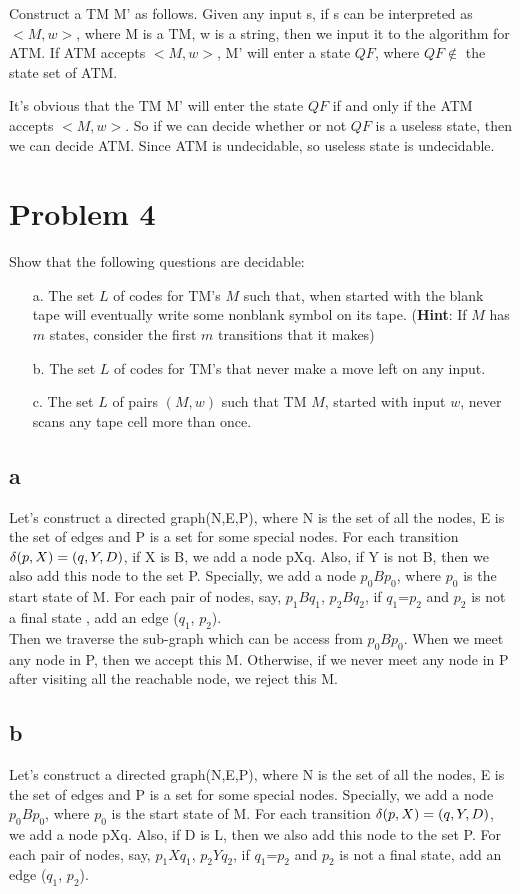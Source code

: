 \documentclass[a4paper,UTF8]{ctexart}
\theoremstyle{definition}
\begin{document}
Construct a TM M' as follows.
Given any input s, if s can be interpreted as $<M,w>$, where M is a TM, w is a string,
then we input it to the algorithm for ATM. If ATM accepts $<M,w>$, M' will enter a state $QF$, where
$QF \notin$ the state set of ATM.

 It's obvious that the TM M' will enter the state $QF$ if and only if the 
ATM accepts $<M,w>$. So if we can decide whether or not $QF$ is a useless state, then we can decide ATM. Since
ATM is undecidable, so useless state is undecidable.


\section*{Problem 4}
Show that the following questions are decidable:
\begin{enumerate}
  \item[a.] The set $L$ of codes for TM’s $M$ such that, when started with the blank tape will eventually write some nonblank symbol on its tape. (\textbf{Hint}: If $M$ has $m$ states, consider the first $m$ transitions that it makes)
  \item[b.] The set $L$ of codes for TM’s that never make a move left on any input.
  \item[c.] The set $L$ of pairs $(M,w)$ such that TM $M$, started with input $w$, never scans any tape cell more than once.
\end{enumerate}

\subsection*{a}
Let's construct a directed graph(N,E,P), where N is the set of all the nodes, 
E is the set of edges and P is a set for some special nodes. For each transition
$\delta(p,X)=(q,Y,D)$, if X is B, we add a node pXq. Also, if Y is not B, then 
we also add this node to the set P. Specially, we add a node $p_0Bp_0$, where $p_0$ is 
the start state of M. 
For each pair of nodes, say, $p_1Bq_1$, $p_2Bq_2$, 
if $q_1$=$p_2$ and $p_2$ is not a final state , add an edge ($q_1$, $p_2$). \\

Then we traverse the sub-graph which can be access from $p_0Bp_0$. When we meet any node in P, then 
we accept this M. Otherwise, if we never meet any node in P after visiting all the reachable 
node, we reject this M.


\subsection*{b}
Let's construct a directed graph(N,E,P), where N is the set of all the nodes, 
E is the set of edges and P is a set for some special nodes. Specially, we add a node $p_0Bp_0$,
 where $p_0$ is 
the start state of M.  For each transition
$\delta(p,X)=(q,Y,D)$, we add a node pXq. Also, if D is L, then 
we also add this node to the set P. For each pair of nodes, say, $p_1Xq_1$, $p_2Yq_2$, 
if $q_1$=$p_2$ and $p_2$ is not a final state, add an edge ($q_1$, $p_2$). \\
\end{document}
